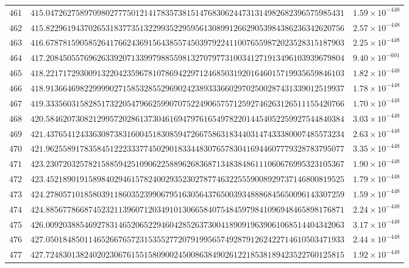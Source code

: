 \documentclass[12pt,reqno]{amsart}
\theoremstyle{remark}
\begin{document}
\begin{longtable}{clc}
$461$ & $415.0472627589709802777501214178357381514768306244731314982682396575985431$ & $1.59\times 10^{-448}$ \\
$462$ & $415.8229619437026531837735132299352295956130899126629053984386236342620756$ & $2.57\times 10^{-448}$ \\
$463$ & $416.6787815905852641766243691564385574503979224110076559872023528315187903$ & $2.25\times 10^{-448}$ \\
$464$ & $417.2084505576962633920713399798855981327079773100341271913496103939679804$ & $9.40\times 10^{-601}$ \\
$465$ & $418.2217172930091322042359678107869422971246850319201646015719935659846103$ & $1.82\times 10^{-448}$ \\
$466$ & $418.9136646982299990271585328552969024238933366029702500287431339012519937$ & $1.78\times 10^{-448}$ \\
$467$ & $419.3335603158285173220547966259907075224906575712592746263126511155420766$ & $1.70\times 10^{-448}$ \\
$468$ & $420.5846207308212995720286137304616947976165497822014454052259927544840384$ & $3.03\times 10^{-448}$ \\
$469$ & $421.4376541243363087383160045183085947266758631834403147433380007485573234$ & $2.63\times 10^{-448}$ \\
$470$ & $421.9625589178358451222333774502901833448307657830416944607779328783795077$ & $3.35\times 10^{-448}$ \\
$471$ & $423.2307203257821588594251090622588962683687134838486111060676995323105367$ & $1.90\times 10^{-448}$ \\
$472$ & $423.4521890191589840294615782400293523027877463225559008929737146800819525$ & $1.79\times 10^{-448}$ \\
$473$ & $424.2780571018580391186035239906795163056437650039348886845650096143307259$ & $1.59\times 10^{-448}$ \\
$474$ & $424.8856778668745232113960712034910130665840754845979841096948465898176871$ & $2.24\times 10^{-448}$ \\
$475$ & $426.0092038854692783146520652294604285263730041890919639061068514404342063$ & $3.17\times 10^{-448}$ \\
$476$ & $427.0501848501146526676572315355277207919956574928791262422714610503471933$ & $2.44\times 10^{-448}$ \\
$477$ & $427.7248301382402023067615515809002450086384902612218538189423522760125815$ & $1.92\times 10^{-448}$ \\

\end{longtable}
\end{document}
